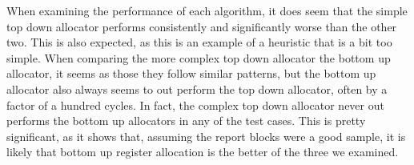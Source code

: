 \documentclass[12pt]{article}
\begin{document}
    When examining the performance of each algorithm, it does seem that the
    simple top down allocator performs consistently and significantly worse than
    the other two. This is also expected, as this is an example of a heuristic
    that is a bit too simple. When comparing the more complex top down allocator
    the bottom up allocator, it seems as those they follow similar patterns,
    but the bottom up allocator also always seems to out perform the top down
    allocator, often by a factor of a hundred cycles. In fact, the complex top
    down allocator never out performs the bottom up allocators in any of the
    test cases. This is pretty significant, as it shows that, assuming the
    report blocks were a good sample, it is likely that bottom
    up register allocation is the better of the three we examined.
\end{document}
